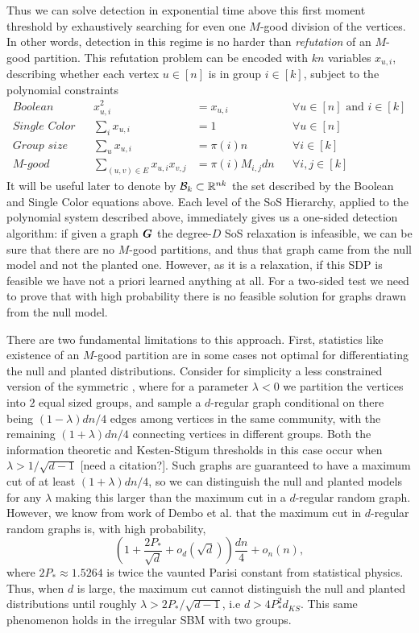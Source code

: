 Thus we can solve detection in exponential time above this first moment threshold by exhaustively searching for even one $M$-good division of the vertices. In other words, detection in this regime is no harder than \emph{refutation} of an $M$-good partition. This refutation problem can be encoded with $kn$ variables $x_{u,i}$, describing whether each vertex $u \in [n]$ is in group $i \in [k]$, subject to the polynomial constraints
%
\begin{align*}
	\textit{Boolean} & & x_{u,i}^2 &= x_{u,i} & &\forall u\in[n] \text{ and } i\in [k] \\
	\textit{Single Color} & & \sum_i x_{u,i} &= 1 & &\forall u\in[n] \\
	\textit{Group size} & &\sum_u x_{u,i} &= \pi(i)n  & & \forall i\in[k]\\
	\textit{$M$-good} & &\sum_{(u,v)\in E} x_{u,i}x_{v,j} &= \pi(i)M_{i,j}dn & &\forall i,j\in[k]
\end{align*}
%
It will be useful later to denote by $\mathcal{B}_k \subset \mathbb{R}^{nk}$ the set described by the Boolean and Single Color equations above. Each level of the SoS Hierarchy, applied to the polynomial system described above, immediately gives us a one-sided detection algorithm: if given a graph $\boldsymbol{G}$ the degree-$D$ SoS relaxation is infeasible, we can be sure that there are no $M$-good partitions, and thus that graph came from the null model and not the planted one. However, as it is a relaxation, if this SDP is feasible we have not a priori learned anything at all. For a two-sided test we need to prove that with high probability there is no feasible solution for graphs drawn from the null model. 

There are two fundamental limitations to this approach. First, statistics like existence of an $M$-good partition are in some cases not optimal for differentiating the null and planted distributions. Consider for simplicity a less constrained version of the symmetric \model, where for a parameter $\lambda<0$ we partition the vertices into $2$ equal sized groups, and sample a $d$-regular graph conditional on there being $(1-\lambda)dn/4$ edges among vertices in the same community, with the remaining $(1 + \lambda)dn/4$ connecting vertices in different groups. Both the information theoretic and Kesten-Stigum thresholds in this case occur when $\lambda > 1/\sqrt{d-1}$ [need a citation?]. Such graphs are guaranteed to have a maximum cut of at least $(1+\lambda)dn/4$, so we can distinguish the null and planted models for any $\lambda$ making this larger than the maximum cut in a $d$-regular random graph. However, we know from work of Dembo et al. \cite{dembo2017extremal_dup} that the maximum cut in $d$-regular random graphs is, with high probability,
$$
    \left(1 + \frac{2P_\ast}{\sqrt d} + o_d(\sqrt d)\right)\frac{dn}{4} + o_n(n),
$$ 
where $2P_\ast \approx 1.5264$ is twice the vaunted Parisi constant from statistical physics. Thus, when $d$ is large, the maximum cut cannot distinguish the null and planted distributions until roughly $\lambda > 2P_\ast/\sqrt{d-1}$, i.e $d > 4P_\ast^2 d_{KS}$. This same phenomenon holds in the irregular SBM with two groups.

